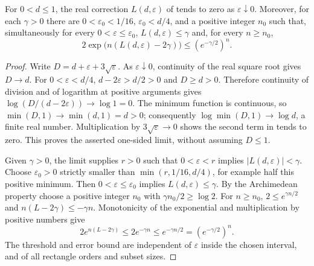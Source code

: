 \begin{lemma}
For $0<d\le1$, the real correction $L(d,\varepsilon)$ of
 tends to zero as
$\varepsilon\downarrow0$. Moreover, for each $\gamma>0$ there are
$0<\varepsilon_0<1/16$, $\varepsilon_0<d/4$, and a positive integer $n_0$
such that, simultaneously for every $0<\varepsilon\le\varepsilon_0$,
$L(d,\varepsilon)\le\gamma$ and, for every $n\ge n_0$,
\[
 2\exp\bigl(n(L(d,\varepsilon)-2\gamma)\bigr)
 \le (e^{-\gamma/2})^n.
\]
\end{lemma}
\begin{proof}
Write $D=d+\varepsilon+3\sqrt\varepsilon$. As
$\varepsilon\downarrow0$, continuity of the real square root gives
$D\to d$. For $0<\varepsilon<d/4$, $d-2\varepsilon>d/2>0$
and $D\ge d>0$. Therefore continuity of division and of logarithm at
positive arguments gives
$\log(D/(d-2\varepsilon))\to\log1=0$.
The minimum function is continuous, so
$\min(D,1)\to\min(d,1)=d>0$; consequently
$\log\min(D,1)\to\log d$, a finite real number. Multiplication by
$3\sqrt\varepsilon\to0$ shows the second term in
 tends to zero. This proves
the asserted one-sided limit, without assuming $D\le1$.

Given $\gamma>0$, the limit supplies $r>0$ such that
$0<\varepsilon<r$ implies $|L(d,\varepsilon)|<\gamma$.
Choose $\varepsilon_0>0$ strictly smaller than
$\min(r,1/16,d/4)$, for example half this positive minimum.
Then $0<\varepsilon\le\varepsilon_0$ implies $L(d,\varepsilon)\le\gamma$.
By the Archimedean property choose a positive integer $n_0$ with
$\gamma n_0/2\ge\log2$. For $n\ge n_0$,
$2\le e^{\gamma n/2}$ and $n(L-2\gamma)\le-\gamma n$.
Monotonicity of the exponential and multiplication by positive numbers
give
\[
 2e^{n(L-2\gamma)}\le2e^{-\gamma n}
 \le e^{-\gamma n/2}=(e^{-\gamma/2})^n.
\]
The threshold and error bound are independent of $\varepsilon$ inside the
chosen interval, and of all rectangle orders and subset sizes.
\end{proof}
